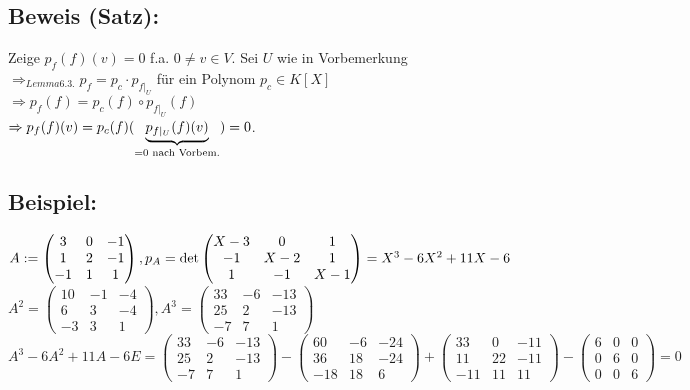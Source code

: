 \documentclass[a4paper, 12pt]{extarticle}
\newcommand{\tn}[1]{\textnormal {#1}}
\begin{document}
\subsection*{Beweis (Satz):}
Zeige $p_f(f)(v) = 0$ f.a. $0\neq v \in V$. Sei $U$ wie in Vorbemerkung\\
$\Rightarrow_{Lemma 6.3.} p_f = p_c \cdot p_{f|_U}$ für ein Polynom $p_c \in K[X]$\\
$\Rightarrow p_f(f) = p_c(f) \circ p_{f|_U}(f)$\\
$\Rightarrow p_f(f)(v) = p_c(f)(\underbrace{p_{f|_U}(f)(v)}_{=0\tn{ nach Vorbem.}}) = 0$.
\subsection*{Beispiel:}
$A:= \left(\begin{matrix}
	3 & 0 & -1\\
	1 & 2 & -1\\
	-1 & 1 & 1
\end{matrix}\right), p_A = \tn{det}\left(\begin{matrix}
X-3 & 0 & 1\\
-1 & X-2 & 1\\
1 & -1 & X-1
\end{matrix}\right) = X^3-6X^2+11X-6$\\
$A^2=\left(\begin{matrix}
	10 & -1 & -4\\
	6 & 3 & -4\\
	-3 & 3 & 1
\end{matrix}\right), A^3 = \left(\begin{matrix}
33 & -6 & -13\\
25 & 2 & -13\\
-7 & 7 & 1
\end{matrix}\right)$\\
$A^3-6A^2+11A-6E = \left(\begin{matrix}
	33 & -6 & -13\\
	25 & 2 & -13\\
	-7 & 7 & 1
\end{matrix}\right) - \left(\begin{matrix}
60 & -6 & -24\\
36 & 18 & -24\\
-18 & 18 & 6
\end{matrix}\right) + \left(\begin{matrix}
33 & 0 & -11\\
11 & 22 & -11\\
-11 & 11 & 11
\end{matrix}\right) - \left(\begin{matrix}
6 & 0 & 0\\
0 & 6 & 0\\
0 & 0 & 6
\end{matrix}\right) = 0$\\
\end{document}
